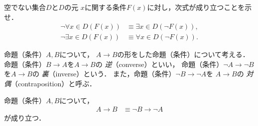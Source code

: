    \begin{que} \label{que:Dnarabanot}
     空でない集合$D$と$D$の元
     $x$に関する条件$F(x)$に対し，次式が成り立つことを示せ．
     \begin{align}
       \lnot \forall x \in D ( F(x) ) & \equiv \exists x \in D ( \lnot F(x) ) ,
       \label{eq:Dnotall} \\
       \lnot \exists x \in D (F(x) ) & \equiv \forall x \in D ( \lnot F(x) ).
       \label{eq:Dnotexists} 
     \end{align}
   \end{que}



   命題（条件）$A ,  B$について，
   $A \to B$の形をした命題（条件）について考える．
   命題（条件）$B \to A$を$A \to B$の
   \emph{逆}（converse）といい，
   命題（条件）$\lnot A \to \lnot B$を$A \to B$の
   \emph{裏}（inverse）という．
   また，命題（条件）$\lnot B \to  \lnot A$を
   $A \to B $の
   \emph{対偶}（contraposition）と呼ぶ．
   \begin{thm} \label{thm:taiguu}
     命題（条件）$A,  B$について，
     \begin{align}
       A \to B & \equiv \lnot B \to \lnot A 
       \label{eq:taiguudouti} 
     \end{align}
     が成り立つ．
   \end{thm}
   
